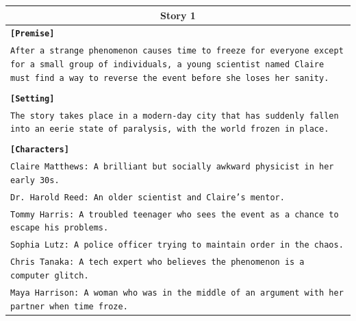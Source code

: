 \documentclass[letterpaper]{article} %
\begin{document}
\begin{small}
  \begin{longtable}{p{\textwidth}}
    \toprule
    \multicolumn{1}{c}{\textbf{Story 1}} \\
    \midrule
    \texttt{\textbf{[Premise]}} \\
    \texttt{After a strange phenomenon causes time to freeze for everyone except for a small group of individuals, a young scientist named Claire must find a way to reverse the event before she loses her sanity.} \\\\
    \texttt{\textbf{[Setting]}} \\
    \texttt{The story takes place in a modern-day city that has suddenly fallen into an eerie state of paralysis, with the world frozen in place.} \\\\
    \texttt{\textbf{[Characters]}} \\
    \texttt{Claire Matthews: A brilliant but socially awkward physicist in her early 30s.} \\
    \texttt{Dr. Harold Reed: An older scientist and Claire's mentor.} \\
    \texttt{Tommy Harris: A troubled teenager who sees the event as a chance to escape his problems.} \\
    \texttt{Sophia Lutz: A police officer trying to maintain order in the chaos.} \\
    \texttt{Chris Tanaka: A tech expert who believes the phenomenon is a computer glitch.} \\
    \texttt{Maya Harrison: A woman who was in the middle of an argument with her partner when time froze.} \\
    \midrule


\end{longtable}
\end{small}
\end{document}
